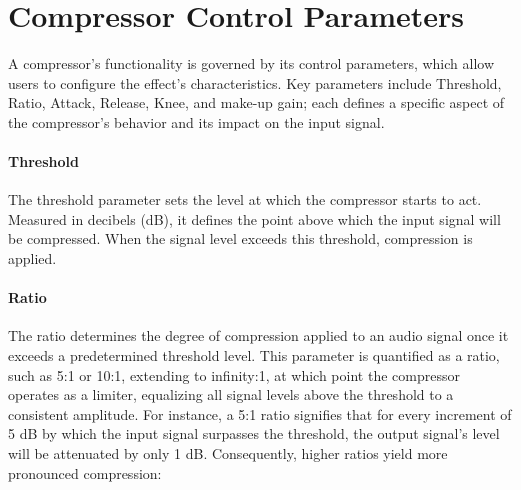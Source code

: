 \documentclass[10pt]{article}
\begin{document}
\begin{multicols*}{2}
\begin{minipage}{\linewidth}
            \label{fig:comp-ratio}
        \end{minipage}

        \section{Compressor Control Parameters}
            A compressor's functionality is governed by its control parameters, which allow users to configure the effect's characteristics. Key parameters include Threshold, Ratio, Attack, Release, Knee, and make-up gain; each defines a specific aspect of the compressor's behavior and its impact on the input signal.

            \paragraph{Threshold}
                The threshold parameter sets the level at which the compressor starts to act. Measured in decibels (dB), it defines the point above which the input signal will be compressed. When the signal level exceeds this threshold, compression is applied.

            \paragraph{Ratio}
                The ratio determines the degree of compression applied to an audio signal once it exceeds a predetermined threshold level. This parameter is quantified as a ratio, such as 5:1 or 10:1, extending to infinity:1, at which point the compressor operates as a limiter, equalizing all signal levels above the threshold to a consistent amplitude. For instance, a 5:1 ratio signifies that for every increment of 5 dB by which the input signal surpasses the threshold, the output signal's level will be attenuated by only 1 dB. Consequently, higher ratios yield more pronounced compression:


\end{multicols*}
\end{document}

